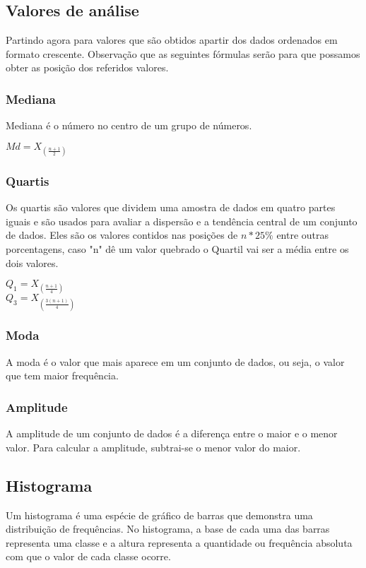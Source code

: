 \documentclass{article}
\begin{document}
\begin{multicols}{2}
      \subsection{Valores de análise}
      Partindo agora para valores que são obtidos apartir dos dados ordenados em formato crescente. 
      Observação que as seguintes fórmulas serão para que possamos obter as posição dos referidos valores.    
    
      \subsubsection{Mediana}
      Mediana é o número no centro de um grupo de números.
      \begin{center}
        $ Md = X_{(\frac{n + 1}{2})} $
      \end{center}
    
      \subsubsection{Quartis}
      Os quartis são valores que dividem uma amostra de dados em quatro partes iguais e são usados para 
      avaliar a dispersão e a tendência central de um conjunto de dados. Eles são os valores contidos nas 
      posições de $ n*25\% $ entre outras porcentagens, caso "n" dê um valor quebrado o Quartil vai ser a 
      média entre os dois valores.
      \begin{center}
        $ Q_1 = X_{(\frac{n + 1}{4})} $ \\
        $ Q_3 = X_{(\frac{3(n + 1)}{4})} $
      \end{center}

      \subsubsection{Moda}
      A moda é o valor que mais aparece em um conjunto de dados, ou seja, o valor que tem maior frequência.

      \subsubsection{Amplitude}
      A amplitude de um conjunto de dados é a diferença entre o maior e o menor valor. Para calcular a amplitude, 
      subtrai-se o menor valor do maior. 
  
      \subsection{Histograma}
        Um histograma é uma espécie de gráfico de barras que demonstra uma distribuição de frequências. No histograma, 
      a base de cada uma das barras representa uma classe e a altura representa a quantidade ou frequência absoluta com 
      que o valor de cada classe ocorre.
      

\end{multicols}
\end{document}
